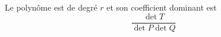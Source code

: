 Le polynôme est de degré $r$ et son coefficient dominant est 
\begin{displaymath}
 \frac{\det T}{\det P \det Q}
\end{displaymath}
